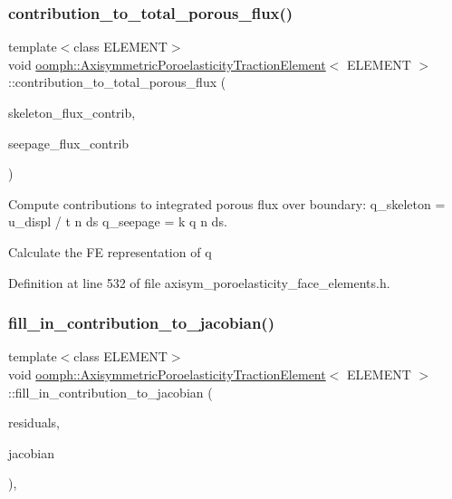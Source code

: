 \subsubsection{\texorpdfstring{contribution\+\_\+to\+\_\+total\+\_\+porous\+\_\+flux()}{contribution\_to\_total\_porous\_flux()}}
{\footnotesize\ttfamily template$<$class E\+L\+E\+M\+E\+NT$>$ \\
void \hyperlink{classoomph_1_1AxisymmetricPoroelasticityTractionElement}{oomph\+::\+Axisymmetric\+Poroelasticity\+Traction\+Element}$<$ E\+L\+E\+M\+E\+NT $>$\+::contribution\+\_\+to\+\_\+total\+\_\+porous\+\_\+flux (\begin{DoxyParamCaption}\item[{double \&}]{skeleton\+\_\+flux\+\_\+contrib,  }\item[{double \&}]{seepage\+\_\+flux\+\_\+contrib }\end{DoxyParamCaption})\hspace{0.3cm}{\ttfamily [inline]}}



Compute contributions to integrated porous flux over boundary\+: q\+\_\+skeleton =   u\+\_\+displ /  t  n ds q\+\_\+seepage =  k q  n ds. 

Calculate the FE representation of q 

Definition at line 532 of file axisym\+\_\+poroelasticity\+\_\+face\+\_\+elements.\+h.

\mbox{\label{classoomph_1_1AxisymmetricPoroelasticityTractionElement_a9779f0ccbce1f73b77c64b91ed9ebefa}} 
\subsubsection{\texorpdfstring{fill\+\_\+in\+\_\+contribution\+\_\+to\+\_\+jacobian()}{fill\_in\_contribution\_to\_jacobian()}}
{\footnotesize\ttfamily template$<$class E\+L\+E\+M\+E\+NT$>$ \\
void \hyperlink{classoomph_1_1AxisymmetricPoroelasticityTractionElement}{oomph\+::\+Axisymmetric\+Poroelasticity\+Traction\+Element}$<$ E\+L\+E\+M\+E\+NT $>$\+::fill\+\_\+in\+\_\+contribution\+\_\+to\+\_\+jacobian (\begin{DoxyParamCaption}\item[{\hyperlink{classoomph_1_1Vector}{Vector}$<$ double $>$ \&}]{residuals,  }\item[{\hyperlink{classoomph_1_1DenseMatrix}{Dense\+Matrix}$<$ double $>$ \&}]{jacobian }\end{DoxyParamCaption})\hspace{0.3cm}{\ttfamily [inline]}, {\ttfamily [virtual]}}



